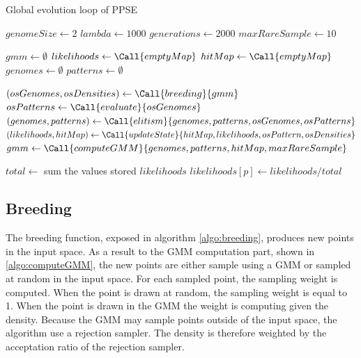 \documentclass[10pt,letterpaper]{article}
\theoremstyle{definition}
\theoremstyle{remark}
\begin{document}
\begin{algorithm}
    \caption{Global evolution loop of PPSE}
    \label{algo:loop}
    \begin{algorithmic}[1]
        \State $genomeSize \gets 2$
        \State $lambda \gets 1000$
        \State $generations \gets 2000$
        \State $maxRareSample \gets 10$

        \Statex
        \State $gmm \gets \emptyset$
        \State $likelihoods \gets \Call{emptyMap}$
        \State $hitMap \gets \Call{emptyMap}$
        \State $genomes \gets \emptyset$
        \State $patterns \gets \emptyset$
        \Statex
        
            \State $(osGenomes, osDensities) \gets \Call{breeding}{gmm}$
            \State $osPatterns \gets \Call{evaluate}{osGenomes}$ 
            \State $(genomes, patterns) \gets \Call{elitism}{genomes, patterns, osGenomes, osPatterns}$
            \State $(likelihoods, hitMap) \gets \Call{updateState}{hitMap, likelihoods, osPattern, osDensities}$
            \State $gmm \gets \Call{computeGMM}{genomes, patterns, hitMap, maxRareSample}$
        \EndFor

        \Statex
        \State $total \gets$ sum the values stored $likelihoods$
           \State $likelihoods[p] \gets likelihoods / total$
        \EndFor

    \end{algorithmic}
\end{algorithm}




\subsection*{Breeding}

The breeding function, exposed in algorithm \ref{algo:breeding}, produces new points in the input space. As a result to the GMM computation part, shown in \ref{algo:computeGMM}, the new points are either sample using a GMM or sampled at random in the input space. For each sampled point, the sampling weight is computed. When the point is drawn at random, the sampling weight is equal to 1. When the point is drawn in the GMM the weight is computing given the density. Because the GMM may sample points outside of the input space, the algorithm use a rejection sampler. The density is therefore weighted by the acceptation ratio of the rejection sampler.
\end{document}
